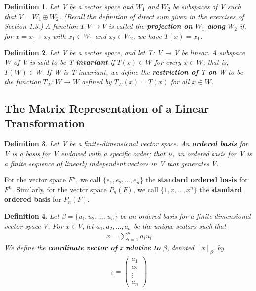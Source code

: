 \documentclass{article}
\newcommand{\bd}[1]{\textbf{#1}}
\theoremstyle{plain}
\newtheorem*{definition1}{Definition}
\theoremstyle{plain} %
\begin{document}
\begin{definition1}
Let V be a vector space and $W_1$ and $W_2$ be subspaces of V such that $V = W_1 \oplus W_2$. (Recall the definition of direct sum given in the exercises of Section 1.3.) A function $T: V \to V$ is called the \bd{projection on} $W_1$ \bd{along} $W_2$ if, for $x = x_1 + x_2$ with $x_1 \in W_1$ and $x_2 \in W_2$, we have $T(x) = x_1$.
\end{definition1}

\begin{definition1}
Let V be a vector space, and let T: V → V be linear. A subspace W of V is said to be T-\bd{invariant} if $T(x) \in W$ for every $x \in W$, that is, $T(W) \in W$. If W is T-invariant, we define the \bd{restriction of} T \bd{on} W to be the function $T_W : W \to W$ defined by $T_W(x) = T(x)$ for all $x \in W$.
\end{definition1}

\subsection{The Matrix Representation of a Linear Transformation}

\begin{definition1}
Let V be a finite-dimensional vector space. An \bd{ordered basis} for V is a basis for V endowed with a specific order; that is, an ordered basis for V is a finite sequence of linearly independent vectors in V that generates V.
\end{definition1}

For the vector space $F^n$, we call $\{e_1, e_2,\ldots,e_n\}$ the \bd{standard ordered basis} for $F^n$. Similarly, for the vector space $P_n(F)$, we call $\{1, x, \ldots , x^n\}$ the \bd{standard ordered basis} for $P_n(F)$.

\begin{definition1}
Let $β = \{u_1, u_2,\ldots,u_n\}$ be an ordered basis for a finite dimensional vector space V. For $x \in V$, let $a_1, a_2,\ldots,a_n$ be the unique scalars such that
\begin{align*}
x=\sum_{i=1}^n a_iu_i
\end{align*}
We define the \bd{coordinate vector of} x \bd{relative to} $\beta$, denoted $[x]_\beta$, by
\begin{align*}
[x]_\beta = \begin{pmatrix}a_1\\a_2\\\vdots\\a_n\end{pmatrix}
\end{align*}
\end{definition1}
\end{document}
